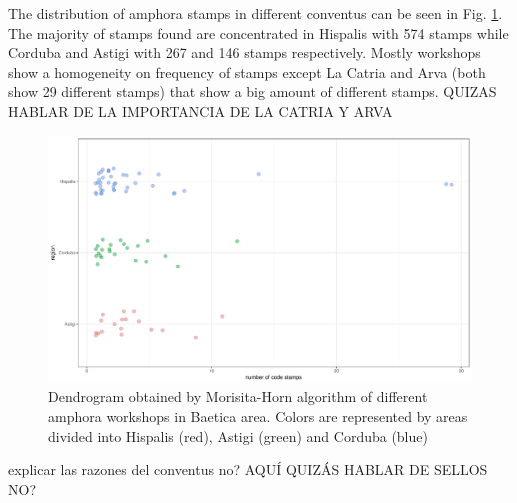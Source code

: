 \documentclass[review]{elsarticle}
\begin{document}
The distribution of amphora stamps in different conventus can be seen in Fig. \ref{frequency}. The majority of stamps found are concentrated in Hispalis with 574 stamps while Corduba and Astigi with 267 and 146 stamps respectively. Mostly workshops show a homogeneity on frequency of stamps except La Catria and Arva (both show 29 different stamps) that show a big amount of different stamps.  QUIZAS HABLAR DE LA IMPORTANCIA DE LA CATRIA Y ARVA


\begin{figure}[htp]
	\centering
\includegraphics[width=\linewidth]{figs/frequency}
\caption{Dendrogram obtained by Morisita-Horn algorithm of different amphora workshops in Baetica area. Colors are represented by areas divided into Hispalis (red), Astigi (green) and Corduba (blue)}
\label{frequency}
\end{figure} 

explicar las razones del conventus no?
AQUÍ QUIZÁS HABLAR DE SELLOS NO?



\end{document}
